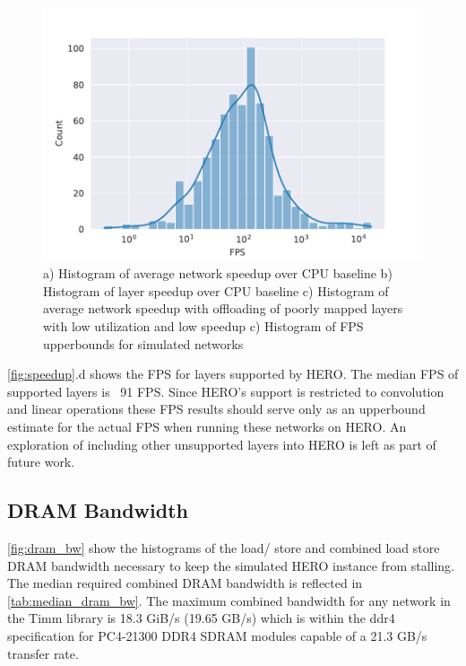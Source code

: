 \begin{figure}
    \hspace{0.1cm} 
    \includegraphics[scale=0.46]{Plots/latency/fps.pdf}
    \caption{a) Histogram of average network speedup over CPU baseline b) Histogram of layer speedup over CPU baseline c) Histogram of average network speedup with offloading of poorly mapped layers with low utilization and low speedup c) Histogram of FPS upperbounds for simulated networks}
    \label{fig:speedup}
\end{figure}

\autoref{fig:speedup}.d  shows the FPS for layers supported by HERO. The median
FPS of supported layers is ~91 FPS. Since HERO's support is restricted to
convolution and linear operations these FPS results should serve only as an
upperbound estimate for the actual FPS when running these networks on HERO. An
exploration of including other unsupported layers into HERO is left as part of
future work.  

\subsection{DRAM Bandwidth}
\label{chap:hero:results:bw}

\autoref{fig:dram_bw} show the histograms of the load/ store and combined
load store DRAM bandwidth necessary to keep the simulated HERO instance from
stalling. The median required combined DRAM bandwidth is reflected in
\autoref{tab:median_dram_bw}. The maximum combined bandwidth for any network in
the Timm library is 18.3 GiB/s (19.65 GB/s) which is within the ddr4 specification for
PC4-21300 DDR4 SDRAM modules \cite{wiki:List_of_interface_bit_rates} capable of
a 21.3 GB/s transfer rate. 

